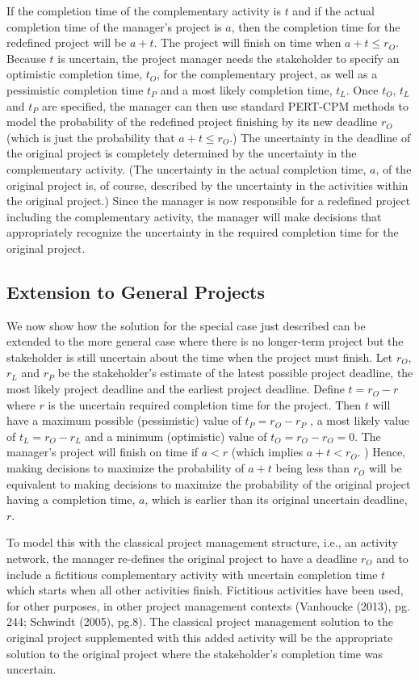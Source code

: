 \documentclass[11pt]{article}
\begin{document}
          If the completion time of the complementary activity is $t$ and if the actual completion time of the manager's project is $a$, then the completion time for the redefined project will be $a+t$.   The project will finish on time when $a+t \leq r_O$.    Because $t$ is uncertain, the project manager needs the stakeholder to specify an optimistic completion time, $t_O$, for the complementary project, as well as a pessimistic completion time $t_P$  and a most likely completion time, $t_L$.  Once $t_O$, $t_L$ and $t_P$ are specified, the manager can then use standard PERT-CPM methods to model the probability of the redefined project finishing by its new deadline $r_O$ (which is just the probability that $a+t \leq r_O$.)   The uncertainty in the deadline of the original project is completely determined by the uncertainty in the complementary activity.   (The uncertainty in the actual completion time, $a$, of the original project is, of course, described by the uncertainty in the activities within the original project.)  Since the manager is now responsible for a redefined project including the complementary activity, the manager will make decisions that appropriately recognize the uncertainty in the required completion time for the original project.
\subsection{Extension to General Projects}
          We now show how the solution for the special case just described can be extended to the more general case where there is no longer-term project but the stakeholder is still uncertain about the time when the project must finish.  Let $r_O$, $r_L$ and $r_P$ be the stakeholder's estimate of the latest possible project deadline, the most likely project deadline and the earliest project deadline.  Define $t=r_O-r$ where $r$ is the uncertain required completion time for the project.  Then $t$ will have a maximum possible (pessimistic) value of  $t_P = r_O-r_P$ , a most likely value of  $t_L = r_O-r_L$ and a minimum (optimistic) value of   $t_O = r_O-r_O=0$.  The manager's project will finish on time if $a < r $ (which implies $a+t < r_O$. )  Hence, making decisions to maximize the probability of $a+t$ being less than $r_O$ will be equivalent to making decisions to maximize the probability of the original project having a completion time, $a$, which is earlier than its original uncertain deadline, $r$.  \par
          To model this with the classical project management structure, i.e., an activity network, the manager re-defines the original project to have a deadline $r_O$ and to include a fictitious complementary activity with uncertain completion time $t$ which starts when all other activities finish.   Fictitious activities have been used, for other purposes, in other project management contexts (Vanhoucke (2013), pg. 244; Schwindt (2005), pg.8).  The classical project management solution to the original project supplemented with this added activity will be the appropriate solution to the original project where the stakeholder's completion time was uncertain.
\end{document}
